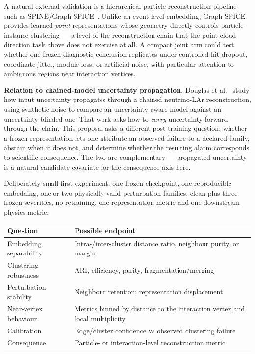 \documentclass[10pt,twocolumn]{extarticle}
\begin{document}
A natural external validation is a hierarchical particle-reconstruction
pipeline such as SPINE/Graph-SPICE~\cite{koh2020}. Unlike an event-level
embedding, Graph-SPICE provides learned \emph{point} representations whose
geometry directly controls particle-instance clustering --- a level of the
reconstruction chain that the point-cloud direction task above does not
exercise at all. A compact joint arm could test whether one frozen diagnostic
conclusion replicates under controlled hit dropout, coordinate jitter, module
loss, or artificial noise, with particular attention to ambiguous regions near
interaction vertices.

\textbf{Relation to chained-model uncertainty propagation.} Douglas et
al.~\cite{douglas2024} study how input uncertainty propagates through a chained
neutrino-LAr reconstruction, using synthetic noise to compare an
uncertainty-aware model against an uncertainty-blinded one. That work asks how
to \emph{carry} uncertainty forward through the chain. This proposal asks a
different post-training question: whether a frozen representation lets one
attribute an observed failure to a declared family, abstain when it does not,
and determine whether the resulting alarm corresponds to scientific
consequence. The two are complementary --- propagated uncertainty is a natural
candidate covariate for the consequence axis here.

Deliberately small first experiment: one frozen checkpoint, one reproducible
embedding, one or two physically valid perturbation families, clean plus three
frozen severities, no retraining, one representation metric and one downstream
physics metric.

\begin{center}
\scriptsize
{}
\begin{tabularx}{\columnwidth}{@{}p{0.88in}Y@{}}
\toprule
Question & Possible endpoint \\
\midrule
Embedding separability & Intra-/inter-cluster distance ratio, neighbour
purity, or margin \\
Clustering robustness & ARI, efficiency, purity, fragmentation/merging \\
Perturbation stability & Neighbour retention; representation displacement \\
Near-vertex behaviour & Metrics binned by distance to the interaction vertex
and local multiplicity \\
Calibration & Edge/cluster confidence vs observed clustering failure \\
Consequence & Particle- or interaction-level reconstruction metric \\
\bottomrule
\end{tabularx}
\label{tab:spine}
\vspace{-0.4em}
\end{center}
\end{document}
